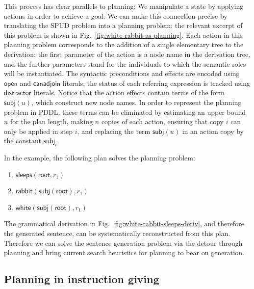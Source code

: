 This process has clear parallels to planning: We manipulate a state by
applying actions in order to achieve a goal.  We can make this
connection precise by translating the SPUD problem into a planning
problem; the relevant excerpt of this problem is shown in
Fig.~\ref{fig:white-rabbit-as-planning}.  Each action in this planning
problem corresponds to the addition of a single elementary tree to the
derivation; the first parameter of the action is a node name in the
derivation tree, and the further parameters stand for the individuals
to which the semantic roles will be instantiated.  The syntactic
preconditions and effects are encoded using $\mathsf{open}$ and
$\mathsf{canadjoin}$ literals; the status of each referring expression
is tracked using $\mathsf{distractor}$ literals.  Notice that the
action effects contain terms of the form $\mathsf{subj}(u)$, which
construct new node names.  In order to represent the planning problem
in PDDL, these terms can be eliminated by estimating an upper bound
$n$ for the plan length, making $n$ copies of each action, ensuring
that copy $i$ can only be applied in step $i$, and replacing the term
$\mathsf{subj}(u)$ in an action copy by the constant
$\mathsf{subj}_i$.

In the example, the following plan solves the planning problem:
\begin{enumerate}
\item $\mathsf{sleeps}(\mathsf{root}, r_1)$
\item $\mathsf{rabbit}(\mathsf{subj}(\mathsf{root}), r_1)$
\item $\mathsf{white}(\mathsf{subj}(\mathsf{root}), r_1)$
\end{enumerate}

The grammatical derivation in
Fig.~\ref{fig:white-rabbit-sleeps-deriv}, and therefore the generated
sentence, can be systematically reconstructed from this plan.
Therefore we can solve the sentence generation problem via the detour
through planning and bring current search heuristics for planning to
bear on generation.








\subsection{Planning in instruction giving}

